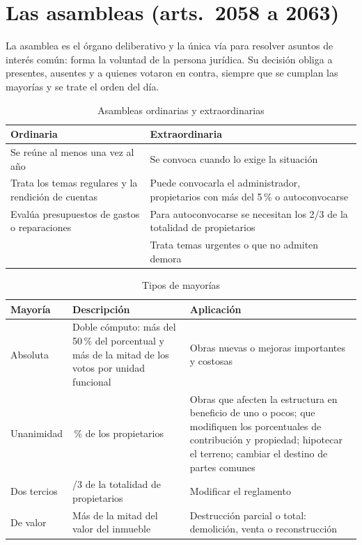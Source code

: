 \documentclass[12pt,oneside]{book}
\begin{document}
\section{Las asambleas (arts.~2058 a 2063)}

La asamblea es el órgano deliberativo y la única vía para resolver asuntos de interés común: forma la voluntad de la persona jurídica. Su decisión obliga a presentes, ausentes y a quienes votaron en contra, siempre que se cumplan las mayorías y se trate el orden del día.

\begin{table}[H]
\centering
\small
\begin{tabularx}{\textwidth}{>{\raggedright\arraybackslash}X>{\raggedright\arraybackslash}X}
\toprule
\textbf{Ordinaria} & \textbf{Extraordinaria} \\
\midrule
Se reúne al menos una vez al año & Se convoca cuando lo exige la situación \\
Trata los temas regulares y la rendición de cuentas & Puede convocarla el administrador, propietarios con más del 5\,\% o autoconvocarse \\
Evalúa presupuestos de gastos o reparaciones & Para autoconvocarse se necesitan los 2/3 de la totalidad de propietarios \\
 & Trata temas urgentes o que no admiten demora \\
\bottomrule
\end{tabularx}
\caption{Asambleas ordinarias y extraordinarias}
\end{table}

\begin{table}[H]
\centering
\small
\begin{tabularx}{\textwidth}{>{\raggedright\arraybackslash}p{}>{\raggedright\arraybackslash}X>{\raggedright\arraybackslash}X}
\toprule
\textbf{Mayoría} & \textbf{Descripción} & \textbf{Aplicación} \\
\midrule
Absoluta & Doble cómputo: más del 50\,\% del porcentual y más de la mitad de los votos por unidad funcional & Obras nuevas o mejoras importantes y costosas \\
Unanimidad & 100\,\% de los propietarios & Obras que afecten la estructura en beneficio de uno o pocos; que modifiquen los porcentuales de contribución y propiedad; hipotecar el terreno; cambiar el destino de partes comunes \\
Dos tercios & 2/3 de la totalidad de propietarios & Modificar el reglamento \\
De valor & Más de la mitad del valor del inmueble & Destrucción parcial o total: demolición, venta o reconstrucción \\
\bottomrule
\end{tabularx}
\caption{Tipos de mayorías}
\end{table}
\end{document}
